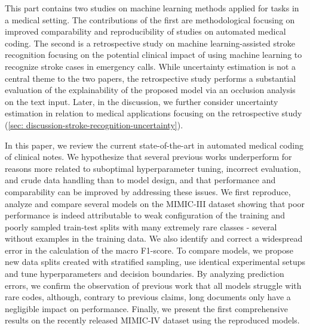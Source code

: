  
This part contains two studies on machine learning methods applied for tasks in a medical setting. The contributions of the first are methodological focusing on improved comparability and reproducibility of studies on automated medical coding. The second is a retrospective study on machine learning-assisted stroke recognition focusing on the potential clinical impact of using machine learning to recognize stroke cases in emergency calls. 
While uncertainty estimation is not a central theme to the two papers, the retrospective study performs a substantial evaluation of the explainability of the proposed model via an occlusion analysis on the text input. 
Later, in the discussion, we further consider uncertainty estimation in relation to medical applications focusing on the retrospective study (\cref{sec: discussion-stroke-recognition-uncertainty}).

In this paper, we review the current state-of-the-art in automated medical coding of clinical notes. 
We hypothesize that several previous works underperform for reasons more related to suboptimal hyperparameter tuning, incorrect evaluation, and crude data handling than to model design, and that performance and comparability can be improved by addressing these issues. 
We first reproduce, analyze and compare several models on the MIMIC-III dataset showing that poor performance is indeed attributable to weak configuration of the training and poorly sampled train-test splits with many extremely rare classes - several without examples in the training data. 
We also identify and correct a widespread error in the calculation of the macro F1-score. 
To compare models, we propose new data splits created with stratified sampling, use identical experimental setups and tune hyperparameters and decision boundaries. 
By analyzing prediction errors, we confirm the observation of previous work that all models struggle with rare codes, although, contrary to previous claims, long documents only have a negligible impact on performance. 
Finally, we present the first comprehensive results on the recently released MIMIC-IV dataset using the reproduced models. 

